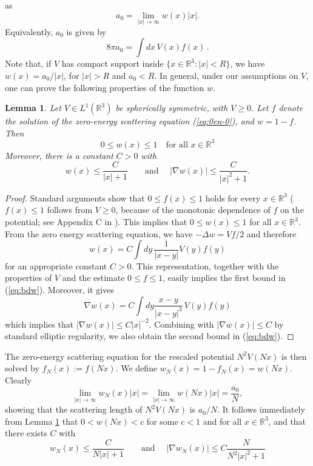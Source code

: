\documentclass[11pt,a4paper]{article}
\newtheorem{lem}[thm]{Lemma}
\newcommand{\bR}{{\mathbb R}}
\begin{document}
as
\[
  a_0 = \lim_{|x| \to \infty} w(x)|x|.
\]
Equivalently, $a_0$ is given by 
\[  8 \pi a_0 = \int dx \, V(x) f(x) \, . \]
Note that, if $V$ has compact support inside $\{ x \in \bR^3 : |x| < R \}$, we have $w(x) = a_0/|x|$, for $|x| > R$ and $a_0 < R$. In general, under our assumptions on $V$, one can prove the following properties of the function $w$.
\begin{lem}\label{lm:w}
Let $V \in L^1 (\bR^3)$ be spherically symmetric, with $V \geq 0$. Let $f$ denote the solution of the zero-energy scattering equation (\ref{eq:0en-0}), and $w = 1 - f$. Then 
\[ 0 \leq w(x) \leq 1 \quad \text{for all } x \in \bR^3 \]
Moreover, there is a constant $C>0$ with 
\begin{equation}\label{eq:bdw} w(x) \leq \frac{C}{|x|+1} \qquad \text{and } \quad  |\nabla w (x)| \leq \frac{C}{|x|^2 + 1}. \end{equation}
\end{lem}
\begin{proof}
Standard arguments show that $0 \leq f (x) \leq 1$ holds for every $x \in \bR^3$ ($f  (x) \leq 1$ follows from $V \geq 0$, because of the monotonic dependence of $f$ on the potential; see Appendix C in \cite{LSSY}). This implies that $0 \leq w (x) \leq 1$ for all $x \in \bR^3$. {F}rom the zero energy scattering equation, we have $-\Delta w = Vf /2$ and therefore
\[ w(x) = C \int dy \, \frac{1}{|x-y|} V (y) f (y) \]
for an appropriate constant $C>0$. This representation, together with the properties of $V$ and the estimate $0 \leq f \leq 1$, easily implies the first bound in (\ref{eq:bdw}). Moreover, it gives 
\[ \nabla w (x) = C \int dy \frac{x-y}{|x-y|^3} \, V (y) f (y) \]
which implies that $|\nabla w (x)| \leq C |x|^{-2}$. Combining with $|\nabla w (x)| \leq C$ by standard elliptic regularity, we also obtain the second bound in (\ref{eq:bdw}). 
\end{proof}

The zero-energy scattering equation for the rescaled potential $N^2 V (Nx)$ is then solved by $f_N (x) := f (Nx)$. We define $w_N (x) = 1- f_N (x) = w(Nx)$. Clearly 
\[ \lim_{|x| \to \infty} w_N(x) |x| = \lim_{|x| \to \infty} w(Nx) |x| = \frac{a_0}{N} ,\]
showing that the scattering length of $N^2 V(Nx)$ is $a_0/N$. It follows immediately from Lemma \ref{lm:w} that $0 < w(Nx) < c$ for some $c <1$ and for all $x \in \bR^3$, and that there exists $C$ with 
\begin{equation}\label{eq:wN-bd} w_N (x) \leq \frac{C}{N|x| + 1} \qquad \text{and } \quad |\nabla w_N (x)| \leq C \frac{N}{N^2 |x|^2 + 1} \end{equation}
\end{document}
